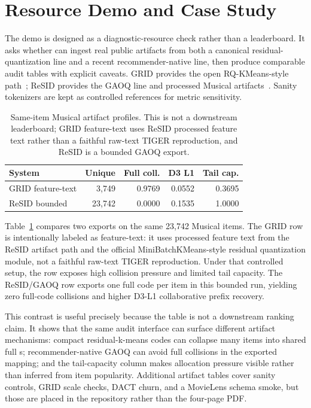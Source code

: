 \section{Resource Demo and Case Study}

The demo is designed as a diagnostic-resource check rather than a leaderboard.
It asks whether \tool can ingest real public \sid artifacts from both a
canonical residual-quantization line and a recent recommender-native line, then
produce comparable audit tables with explicit caveats. GRID provides the
open RQ-KMeans-style path~\cite{ju2025grid}; ReSID provides the GAOQ line and
processed Musical artifacts~\cite{liang2026resid}. Sanity tokenizers are kept
as controlled references for metric sensitivity.

\begin{table}[t]
\caption{Same-item Musical artifact profiles. This is not a downstream
leaderboard; GRID feature-text uses ReSID processed feature text rather than a
faithful raw-text TIGER reproduction, and ReSID is a bounded GAOQ export.}
\label{tab:musical-diagnostic}
\small
\setlength{\tabcolsep}{2.8pt}
\begin{tabular}{@{}lrrrr@{}}
\toprule
System & Unique & Full coll. & D3 L1 & Tail cap. \\
\midrule
GRID feature-text & 3,749 & 0.9769 & 0.0552 & 0.3695 \\
ReSID bounded & 23,742 & 0.0000 & 0.1535 & 1.0000 \\
\bottomrule
\end{tabular}
\end{table}

Table~\ref{tab:musical-diagnostic} compares two exports on the same 23,742
Musical items. The GRID row is intentionally labeled as feature-text: it uses
processed feature text from the ReSID artifact path and the official
MiniBatchKMeans-style residual quantization module, not a faithful raw-text
TIGER reproduction. Under that controlled setup, the row exposes high collision
pressure and limited tail capacity. The ReSID/GAOQ row exports one full code
per item in this bounded run, yielding zero full-code collisions and higher
D3-L1 collaborative prefix recovery.

This contrast is useful precisely because the table is not a downstream
ranking claim. It shows that the same audit interface can surface different
artifact mechanisms: compact residual-k-means codes can collapse many items
into shared full \sid{}s; recommender-native GAOQ can avoid full collisions in
the exported mapping; and the tail-capacity column makes allocation pressure
visible rather than inferred from item popularity. Additional artifact tables
cover sanity controls, GRID scale checks, DACT churn, and a MovieLens schema
smoke, but those are placed in the repository rather than the four-page PDF.
